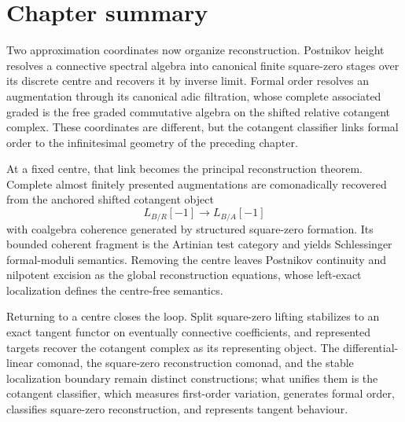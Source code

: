 \section{Chapter summary}
\label{sec:formal-reconstruction-summary}

Two approximation coordinates now organize reconstruction. Postnikov height resolves a
connective spectral algebra into canonical finite square-zero stages over its discrete
centre and recovers it by inverse limit. Formal order resolves an augmentation through
its canonical adic filtration, whose complete associated graded is the free graded
commutative algebra on the shifted relative cotangent complex. These coordinates are
different, but the cotangent classifier links formal order to the infinitesimal geometry
of the preceding chapter.

At a fixed centre, that link becomes the principal reconstruction theorem. Complete
almost finitely presented augmentations are comonadically recovered from the anchored
shifted cotangent object
\[
    L_{B/R}[-1]\longrightarrow L_{B/A}[-1]
\]
with coalgebra coherence generated by structured square-zero formation. Its bounded
coherent fragment is the Artinian test category and yields Schlessinger formal-moduli
semantics. Removing the centre leaves Postnikov continuity and nilpotent excision as the
global reconstruction equations, whose left-exact localization defines the centre-free
semantics.

Returning to a centre closes the loop. Split square-zero lifting stabilizes to an exact
tangent functor on eventually connective coefficients, and represented targets recover
the cotangent complex as its representing object. The differential-linear comonad, the
square-zero reconstruction comonad, and the stable localization boundary remain distinct
constructions; what unifies them is the cotangent classifier, which measures first-order
variation, generates formal order, classifies square-zero reconstruction, and represents
tangent behaviour.

